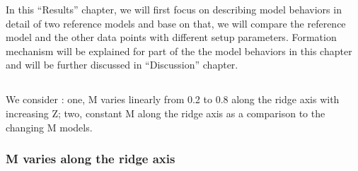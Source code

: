 In this ``Results'' chapter, we will first focus on describing model behaviors in detail of two reference models and base on that, we will compare the reference model and the other data points with different setup parameters. Formation mechanism will be explained for part of the the model behaviors in this chapter and will be further discussed in ``Discussion'' chapter. 

\subsection{}
We consider : one, M varies linearly from 0.2 to 0.8 along the ridge axis with increasing Z; two, constant M along the ridge axis as a comparison to the changing M models.

\subsubsection{M varies along the ridge axis} %

